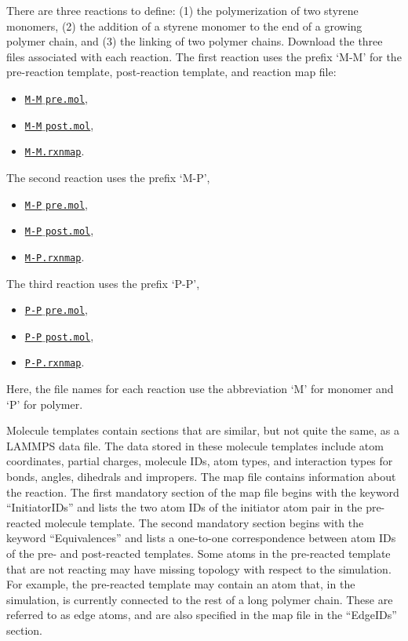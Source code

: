 \documentclass[9pt,tutorial]{livecoms}
\newcommand{\dwlcmd}[1]{\textcolor{download}{\texttt{#1}}} %
\newcommand{\filepath}{https://raw.githubusercontent.com/lammpstutorials/lammpstutorials-article/main/files/}
\begin{document}
There are three reactions to define: (1) the polymerization of two styrene monomers,
(2) the addition of a styrene monomer to the end of a growing polymer chain, and (3) the
linking of two polymer chains.  Download the three files associated with each reaction.
The first reaction uses the prefix `M-M' for the pre-reaction template,
post-reaction template, and reaction map file:
\begin{itemize}
\item \href{\filepath tutorial8/M-M_pre.mol}{\dwlcmd{M-M$\_$pre.mol}},
\item \href{\filepath tutorial8/M-M_post.mol}{\dwlcmd{M-M$\_$post.mol}},
\item \href{\filepath tutorial8/M-M.rxnmap}{\dwlcmd{M-M.rxnmap}}.
\end{itemize}
The second reaction uses the prefix `M-P',
\begin{itemize}
\item \href{\filepath tutorial8/M-P_pre.mol}{\dwlcmd{M-P$\_$pre.mol}},
\item \href{\filepath tutorial8/M-P_post.mol}{\dwlcmd{M-P$\_$post.mol}},
\item \href{\filepath tutorial8/M-P.rxnmap}{\dwlcmd{M-P.rxnmap}}.
\end{itemize}
The third reaction uses the prefix `P-P',
\begin{itemize}
\item \href{\filepath tutorial8/P-P_pre.mol}{\dwlcmd{P-P$\_$pre.mol}},
\item \href{\filepath tutorial8/P-P_post.mol}{\dwlcmd{P-P$\_$post.mol}},
\item \href{\filepath tutorial8/P-P.rxnmap}{\dwlcmd{P-P.rxnmap}}.
\end{itemize}
Here, the file names for each reaction use the abbreviation `M' for monomer and `P'
for polymer.

\begin{note}
{\color{blue}Molecule templates contain sections that are similar, but not quite
the same, as a LAMMPS data file. The data stored in these molecule templates
include atom coordinates, partial charges, molecule IDs, atom types, and interaction
types for bonds, angles, dihedrals and impropers. The map file contains information
about the reaction. The first mandatory section of the map file begins with the
keyword “InitiatorIDs” and lists the two atom IDs of the initiator atom pair in
the pre-reacted molecule template. The second mandatory section begins with the
keyword “Equivalences” and lists a one-to-one correspondence between atom IDs of
the pre- and post-reacted templates. Some atoms in the pre-reacted template that
are not reacting may have missing topology with respect to the simulation. For
example, the pre-reacted template may contain an atom that, in the simulation,
is currently connected to the rest of a long polymer chain. These are referred to
as edge atoms, and are also specified in the map file in the “EdgeIDs” section.}
\end{note}
\end{document}
